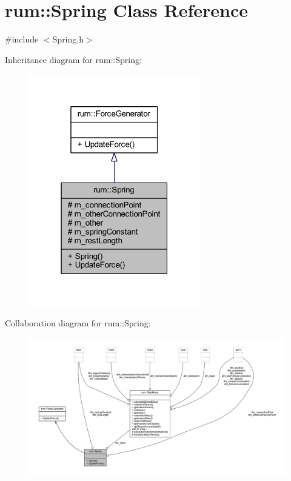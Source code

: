 \hypertarget{classrum_1_1_spring}{}\section{rum\+:\+:Spring Class Reference}
\label{classrum_1_1_spring}


{\ttfamily \#include $<$Spring.\+h$>$}



Inheritance diagram for rum\+:\+:Spring\+:\nopagebreak
\begin{figure}[H]
\begin{center}
\leavevmode
\includegraphics[width=211pt]{classrum_1_1_spring__inherit__graph}
\end{center}
\end{figure}


Collaboration diagram for rum\+:\+:Spring\+:\nopagebreak
\begin{figure}[H]
\begin{center}
\leavevmode
\includegraphics[width=350pt]{classrum_1_1_spring__coll__graph}
\end{center}
\end{figure}
